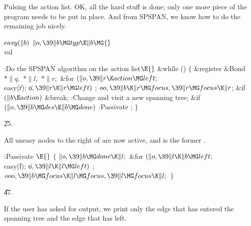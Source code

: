 Pulsing the action list. OK, all the hard stuff is done; only one
more piece of the program needs to be put in place. And from {\mc SPSPAN},
we know how to do the remaining job nicely.

\Y\B\4\D$\\{easy}(\|b)$ \5
$\|o,\39\|b\MG\\{typ}\E\|b\MG{}$\\{val}\par
\Y\B\4:Do the {\mc SPSPAN} algorithm on the action list\X${}\E{}$\6
\&{while} ()\5
${}\{{}$\1\6
\&{register} \&{Bond} ${}{*}\|q,{}$ ${}{*}\|l,{}$ ${}{*}\|r;{}$\7
\&{for} ${}(\|o,\39\|r\K\\{action}\MG\\{left};{}$ \\{easy}(\|r); \|o${},\39\|r%
\K\|r\MG\\{left}){}$\1\5
;\2\6
${}\\{oo},\39\|b\K\|r\MG\\{focus},\39\|r\MG\\{focus}\K\|r{}$;\6
\&{if} ${}(\|b\E\\{action}){}$\1\5
\&{break};\2\6
:Change  and visit a new spanning tree\X;\6
\&{if} ${}(\|o,\39\|b\MG\\{des}\E\|b\MG\\{done}){}$\1\5
:Passivate \X;\2\6
\4${}\}{}$\2\par
\U25.\fi

All uneasy nodes to the right of  are now active, and  is
the
former .

\Y\B\4:Passivate \X${}\E{}$\6
${}\{{}$\1\6
${}\|o,\39\|b\MG\\{done}\K\|l;{}$\6
\&{for} ${}(\|o,\39\|l\K\|b\MG\\{left};{}$ \\{easy}(\|l); \|o${},\39\|l\K\|l\MG%
\\{left}){}$\1\5
;\2\6
${}\\{ooo},\39\|b\MG\\{focus}\K\|l\MG\\{focus},\39\|l\MG\\{focus}\K\|l;{}$\6
\4${}\}{}$\2\par
\U47.\fi

If the user has asked for  output, we print only the
edge that has entered the spanning tree and the edge that has left.

